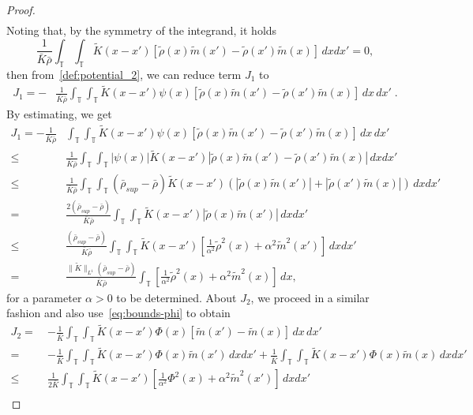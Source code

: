 \documentclass[10pt,reqno]{amsart}
\newcommand{\bbt} {\mathbb T}
\begin{document}
\begin{proof}
\begin{align*}
\end{align*}
Noting that, by the symmetry of the integrand, it holds
\begin{equation*}
    \frac{1}{\bar K\bar\rho}\int_\bbt\int_\bbt \tilde K(x-x')[\tilde \rho(x)\tilde m(x')-\tilde\rho(x')\tilde m(x)]\,dxdx'=0, 
\end{equation*}
then from~\eqref{def:potential_2}, we can reduce term $J_1$ to
\begin{align*}
J_1=- & \frac{1}{\bar K\bar\rho}\int_\bbt\int_\bbt \tilde K (x-x')\psi(x)[\tilde\rho(x) \tilde m(x')-\tilde\rho(x') \tilde m(x)]\,dx\,dx'\;.
\end{align*}
By estimating, we get 
\begin{align*}
 J_1=   -\frac{1}{\bar K\bar\rho} & \int_\bbt\int_\bbt \tilde K (x-x')\psi(x)[\tilde \rho(x) \tilde m(x')-\tilde \rho(x')\tilde m(x)]\,dx\,dx'\\
    \leq & \frac{1}{\bar K\bar\rho}\int_\bbt\int_\bbt |\psi(x)|\tilde K(x-x')|\tilde\rho(x) \tilde m(x') - \tilde\rho(x') \tilde m(x)|\,dxdx'\\
    \leq & \frac{1}{\bar K\bar\rho}\int_\bbt\int_\bbt (\bar\rho_{sup}-\bar\rho)\tilde  K(x-x')(|\tilde \rho(x) \tilde m(x')|+|\tilde\rho(x') \tilde m(x)|)\,dxdx'\\
    = & \frac{2(\bar\rho_{sup}-\bar\rho)}{\bar K\bar\rho}\int_\bbt\int_\bbt \tilde K(x-x')|\tilde\rho(x) \tilde m(x')|\,dxdx'\\
    \leq & \frac{(\bar\rho_{sup}-\bar\rho)}{\bar K\bar\rho}\int_\bbt\int_\bbt \tilde K(x-x')[\frac{1}{\alpha^2}\tilde\rho^2(x)+\alpha^2 \tilde m^2(x')]\,dxdx'\\
    = & \frac{\|\tilde K\|_{L^1}(\bar\rho_{sup}-\bar\rho)}{\bar K\bar\rho}\int_\bbt[\frac{1}{\alpha^2}\tilde\rho^2(x)+\alpha^2 \tilde m^2(x)]\,dx,
\end{align*}
for a parameter $\alpha>0$ to be determined. About $J_2$, we proceed in a similar fashion and also use~\eqref{eq:bounds-phi} to obtain
\begin{align*}
    J_2 =~&-\frac{1}{\bar K}  \int_\bbt\int_\bbt \tilde K (x-x')\Phi(x)[\tilde m(x') - \tilde m(x)]\,dx\,dx'\\ 
    =~& -\frac{1}{\bar K}\int_\bbt\int_\bbt \tilde K(x-x')\Phi(x)\tilde m(x')\,dxdx'
   + \frac{1}{\bar K}\int_\bbt\int_\bbt \tilde K(x-x')\Phi(x)\tilde m(x)\,dxdx'\\
     \leq ~& \frac{1}{2\bar K}\int_\bbt\int_\bbt \tilde K(x-x')[\frac{1}{\alpha^2}\Phi^2(x)+\alpha^2\tilde m^2(x')]\,dxdx'\\

\end{align*}
\end{proof}
\end{document}
